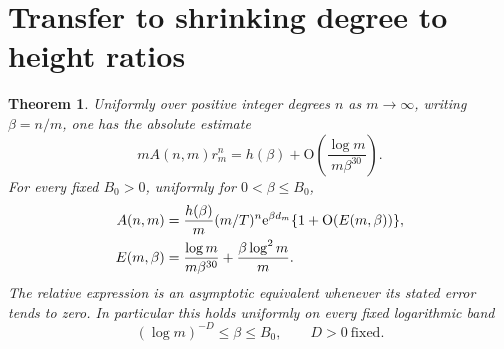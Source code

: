 \documentclass[11pt,letterpaper]{article}
\newtheorem{theorem}{Theorem}[section]
\theoremstyle{remark}\newtheorem{remark}[theorem]{Remark}
\newcommand{\Oh}{\mathrm O}\newcommand{\supp}{\operatorname{supp}}
\begin{document}
\section{Transfer to shrinking degree to height ratios}\label{ied:log:sec:transfer}
\begin{theorem}\label{ied:log:thm:transfer}
Uniformly over positive integer degrees $n$ as $m\to\infty$, writing $\beta=n/m$, one has the absolute estimate
\begin{equation}\label{ied:log:eq:absolute}
 m A(n,m)r_m^n=h(\beta)
                 +\Oh\left(\frac{\log m}{m\beta^{30}}\right).
\end{equation}
For every fixed $B_0>0$, uniformly for $0<\beta\le B_0$,
\begin{align}\label{ied:log:eq:relative}
 A(n,m)&=\frac{h(\beta)}m(m/T)^n\e^{\beta d_m}
           \{1+\Oh(E(m,\beta))\},\\
 E(m,\beta)&=\frac{\log m}{m\beta^{30}}
                   +\frac{\beta\log^2m}{m}.\notag
\end{align}
The relative expression is an asymptotic equivalent whenever its stated error tends to zero. In particular this holds uniformly on every fixed logarithmic band
\begin{equation}\label{ied:log:eq:logband}
 (\log m)^{-D}\le\beta\le B_0,\qquad D>0\ \text{fixed}.
\end{equation}
\end{theorem}
\end{document}
